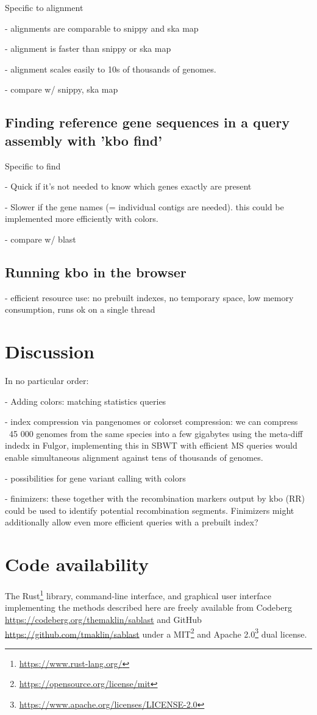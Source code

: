 \documentclass[unnumsec,webpdf,contemporary,large]{oup-authoring-template}%
\theoremstyle{thmstyleone}%
\theoremstyle{thmstyletwo}%
\theoremstyle{thmstylethree}%
\begin{document}
Specific to alignment

- alignments are comparable to snippy and ska map

- alignment is faster than snippy or ska map

- alignment scales easily to 10s of thousands of genomes.

- compare w/ snippy, ska map

\subsection{Finding reference gene sequences in a query assembly with 'kbo find'}

Specific to  find

- Quick if it's not needed to know which genes exactly are present

- Slower if the gene names (= individual contigs are needed). this could be implemented more efficiently with colors.

- compare w/ blast

\subsection{Running kbo in the browser}
- efficient resource use: no prebuilt indexes, no temporary space, low memory consumption, runs ok on a single thread


\section{Discussion}
In no particular order:

- Adding colors: matching statistics queries

- index compression via pangenomes or colorset compression: we can compress ~45 000 genomes from the same species into a few gigabytes using the meta-diff indedx in Fulgor, implementing this in SBWT with efficient MS queries would enable simultaneous alignment against tens of thousands of genomes.

- possibilities for gene variant calling with colors

- finimizers: these together with the recombination markers output by kbo (RR) could be used to identify potential recombination segments. Finimizers might additionally allow even more efficient queries with a prebuilt index?

\section{Code availability}
The Rust\footnote{\url{https://www.rust-lang.org/}} library, command-line interface, and graphical user interface implementing the methods described here are freely available from Codeberg \url{https://codeberg.org/themaklin/sablast} and GitHub \url{https://github.com/tmaklin/sablast} under a MIT\footnote{\url{https://opensource.org/license/mit}} and Apache 2.0\footnote{\url{https://www.apache.org/licenses/LICENSE-2.0}} dual license.
\end{document}
